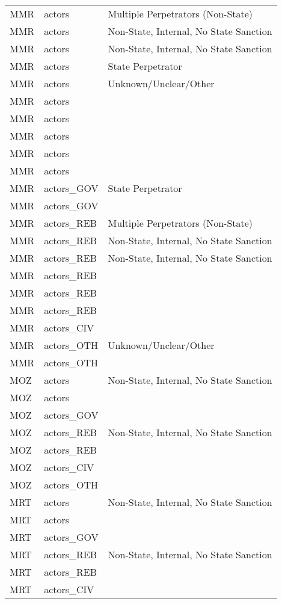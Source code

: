 \begin{table}[ht]
\begin{tabular}{lll}
  MMR & actors & Multiple Perpetrators (Non-State) \\ 
  MMR & actors & Non-State, Internal, No State Sanction \\ 
  MMR & actors & Non-State, Internal, No State Sanction \\ 
  MMR & actors & State Perpetrator \\ 
  MMR & actors & Unknown/Unclear/Other \\ 
  MMR & actors &  \\ 
  MMR & actors &  \\ 
  MMR & actors &  \\ 
  MMR & actors &  \\ 
  MMR & actors &  \\ 
  MMR & actors\_GOV & State Perpetrator \\ 
  MMR & actors\_GOV &  \\ 
  MMR & actors\_REB & Multiple Perpetrators (Non-State) \\ 
  MMR & actors\_REB & Non-State, Internal, No State Sanction \\ 
  MMR & actors\_REB & Non-State, Internal, No State Sanction \\ 
  MMR & actors\_REB &  \\ 
  MMR & actors\_REB &  \\ 
  MMR & actors\_REB &  \\ 
  MMR & actors\_CIV &  \\ 
  MMR & actors\_OTH & Unknown/Unclear/Other \\ 
  MMR & actors\_OTH &  \\ 
  MOZ & actors & Non-State, Internal, No State Sanction \\ 
  MOZ & actors &  \\ 
  MOZ & actors\_GOV &  \\ 
  MOZ & actors\_REB & Non-State, Internal, No State Sanction \\ 
  MOZ & actors\_REB &  \\ 
  MOZ & actors\_CIV &  \\ 
  MOZ & actors\_OTH &  \\ 
  MRT & actors & Non-State, Internal, No State Sanction \\ 
  MRT & actors &  \\ 
  MRT & actors\_GOV &  \\ 
  MRT & actors\_REB & Non-State, Internal, No State Sanction \\ 
  MRT & actors\_REB &  \\ 
  MRT & actors\_CIV &  \\ 

\end{tabular}
\end{table}
